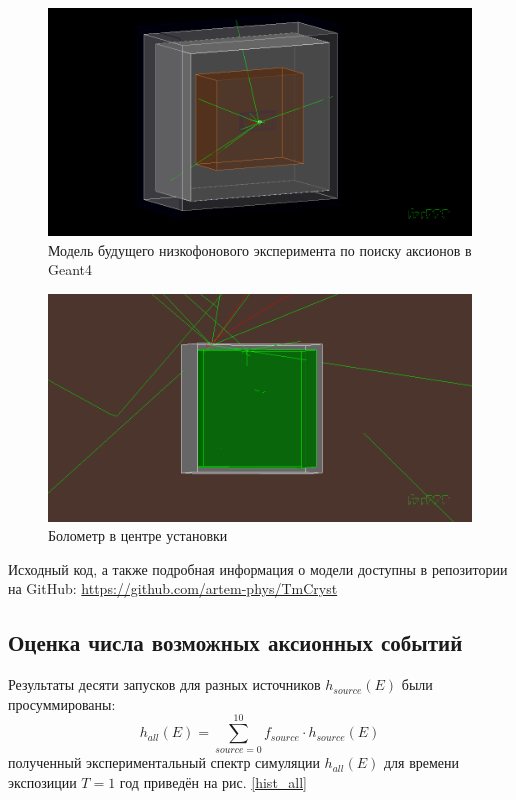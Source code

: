 \documentclass[a4paper,article,14pt]{extarticle}
\begin{document}
\begin{figure}[h]
    \centering
    \includegraphics[width = 0.85 \textwidth]{images/TmCrystVis.png}
    \caption{Модель будущего низкофонового эксперимента по поиску аксионов в Geant4}
    \label{TmVis}
\end{figure}

\begin{figure}[h!]
    \centering
    \includegraphics[width = 0.85 \textwidth]{images/Bolometer.png}
    \caption{Болометр в центре установки}
    \label{TmVisBol}
\end{figure}


Исходный код, а также подробная информация о модели доступны в репозитории на GitHub: \hyperlink{https://github.com/artem-phys/TmCryst}{https://github.com/artem-phys/TmCryst}


\subsection{Оценка числа возможных аксионных событий}
Результаты десяти запусков для разных источников $h_{source}\left( E \right)$ были просуммированы:
\begin{equation}
    {h_{all}}\left( E \right) = \sum\limits_{source = 0}^{10} {{f_{source}} \cdot {h_{source}}\left( E \right)} 
\end{equation}
полученный экспериментальный спектр симуляции $h_{all} \left( E \right)$ для времени экспозиции $T = 1 \text{ год}$ приведён на рис. \ref{hist_all}
\end{document}

